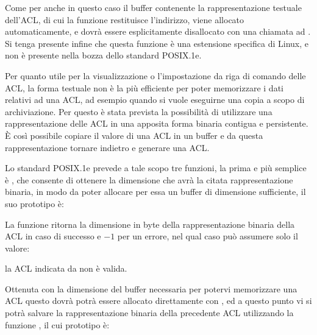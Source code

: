Come per  anche in questo caso il buffer contenente la
rappresentazione testuale dell'ACL, di cui la funzione restituisce
l'indirizzo, viene allocato automaticamente, e dovrà essere esplicitamente
disallocato con una chiamata ad . Si tenga presente infine che
questa funzione è una estensione specifica di Linux, e non è presente nella
bozza dello standard POSIX.1e.

Per quanto utile per la visualizzazione o l'impostazione da riga di comando
delle ACL, la forma testuale non è la più efficiente per poter memorizzare i
dati relativi ad una ACL, ad esempio quando si vuole eseguirne una copia a
scopo di archiviazione. Per questo è stata prevista la possibilità di
utilizzare una rappresentazione delle ACL in una apposita forma binaria
contigua e persistente. È così possibile copiare il valore di una ACL in un
buffer e da questa rappresentazione tornare indietro e generare una ACL.

Lo standard POSIX.1e prevede a tale scopo tre funzioni, la prima e più
semplice è , che consente di ottenere la dimensione che avrà
la citata rappresentazione binaria, in modo da poter allocare per essa un
buffer di dimensione sufficiente, il suo prototipo è:

\begin{funcproto}{
}

{La funzione ritorna la dimensione in byte della rappresentazione binaria
  della ACL in caso di successo e $-1$ per un errore, nel qual caso
   può assumere solo il valore:
  \begin{errlist}
  \item[\errcode{EINVAL}] la ACL indicata da  non è valida.
  \end{errlist}
}  
\end{funcproto}

Ottenuta con  la dimensione del buffer necessaria per potervi
memorizzare una ACL questo dovrà potrà essere allocato direttamente con
, ed a questo punto vi si potrà salvare la rappresentazione
binaria della precedente ACL utilizzando la funzione ,
il cui prototipo è:

